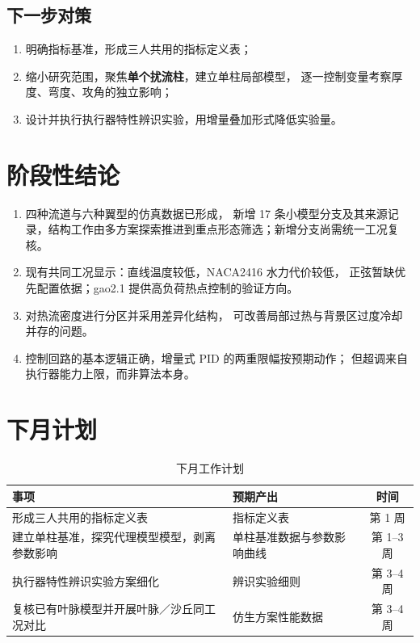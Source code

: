 \documentclass[stage2,fontset=fandol]{ydzjreport}
\begin{document}
\subsection{下一步对策}

\begin{enumerate}
  \item 明确指标基准，形成三人共用的指标定义表；
  \item 缩小研究范围，聚焦\textbf{单个扰流柱}，建立单柱局部模型，
        逐一控制变量考察厚度、弯度、攻角的独立影响；
  \item 设计并执行执行器特性辨识实验，用增量叠加形式降低实验量。
\end{enumerate}

\section{阶段性结论}


\begin{enumerate}
  \item 四种流道与六种翼型的仿真数据已形成，
        新增 17 条小模型分支及其来源记录，结构工作由多方案探索推进到重点形态筛选；新增分支尚需统一工况复核。
  \item 现有共同工况显示：直线温度较低，NACA2416 水力代价较低，
        正弦暂缺优先配置依据；gao2.1 提供高负荷热点控制的验证方向。
  \item 对热流密度进行分区并采用差异化结构，
        可改善局部过热与背景区过度冷却并存的问题。
  \item 控制回路的基本逻辑正确，增量式 PID 的两重限幅按预期动作；
        但超调来自执行器能力上限，而非算法本身。
\end{enumerate}

\section{下月计划}

\begin{table}[H]
\centering
\caption{下月工作计划}
\label{tab:plan}
\begin{tabularx}{\textwidth}{@{}Y Y c@{}}
\toprule
{} 事项 & 预期产出 & 时间 \\
\midrule
形成三人共用的指标定义表 & 指标定义表 & 第 1 周 \\
建立单柱基准，探究代理模型模型，剥离参数影响 & 单柱基准数据与参数影响曲线 & 第 1--3 周 \\
执行器特性辨识实验方案细化 & 辨识实验细则 & 第 3--4 周 \\
复核已有叶脉模型并开展叶脉／沙丘同工况对比 & 仿生方案性能数据 & 第 3--4 周 \\
\bottomrule
\end{tabularx}
\end{table}
\end{document}
